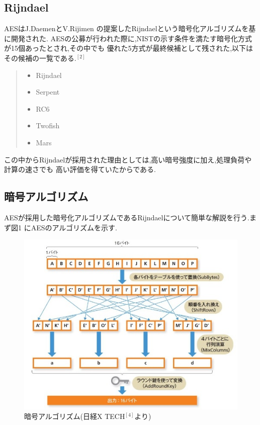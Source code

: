 \documentclass[dvipdfmx,autodetect-engine,titlepage]{jsarticle}
\begin{document}
\subsection{Rijndael}

AESはJ.DaemenとV.Rijimen の提案したRijndaelという暗号化アルゴリズムを基に開発された.
AESの公募が行われた際に,NISTの示す条件を満たす暗号化方式が15個あったとされ,その中でも
優れた5方式が最終候補として残された,以下はその候補の一覧である.\begin{math}^{[2]}\end{math}

\begin{quote}
  \begin{itemize}
   \item Rijndael
   \item Serpent
   \item RC6
   \item Twofish
   \item Mars
  \end{itemize}
\end{quote}

 この中からRijndaelが採用された理由としては,高い暗号強度に加え,処理負荷や計算の速さでも
 高い評価を得ていたからである.

 \subsection{暗号アルゴリズム}

 AESが採用した暗号化アルゴリズムであるRijndaelについて簡単な解説を行う.まず図1
 にAESのアルゴリズムを示す.

\begin{figure}[h]
  \centering
  \includegraphics[scale=0.4]{fig1.jpg}
  \caption{暗号アルゴリズム(日経X TECH\begin{math}^{[4]}\end{math}より)}
\end{figure}
\end{document}
